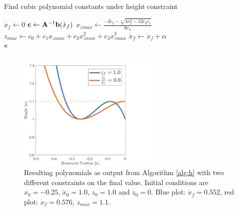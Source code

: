\begin{algorithm}
\caption{Find cubic polynomial constants under height constraint}
\label{alg:h}
\begin{algorithmic}[1]
    \State $\dot{x}_{f}\gets 0$
        \Repeat
            \State $\mathbf{c}\gets \mathbf{A}^{-1}\mathbf{b}(\dot{x}_{f})$ 
            \State $x_{zmax}\gets \frac{-2c_2 - \sqrt{4c_2^2-12c_3c_1}}{6c_3}$ 
            \State $z_{max} \gets c_0 + c_1x_{zmax} + c_2x_{zmax}^2+ c_3x_{zmax}^3$ 
            \State $\dot{x}_{f} \gets \dot{x}_{f}+\alpha$   
        \\
    \Return $\mathbf{c}$
\end{algorithmic}
\end{algorithm}
\begin{figure}[h]
\centering
\includegraphics[width=0.6\textwidth]{STYLESTUFF/polynomialHeightViz.png}
\caption{Resulting polynomials as output from Algorithm \ref{alg:h} with two different constraints on the final value. Initial conditions are $x_0=-0.25$, $\dot{x}_0=1.0$, $z_0=1.0$ and $\dot{z}_0=0$. Blue plot: $\dot{x}_f=0.552$, red plot: $\dot{x}_f=0.576$, $z_{max}=1.1$. }
\label{fig:polheight}
\end{figure}


